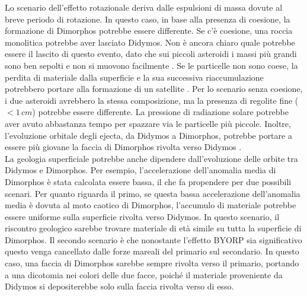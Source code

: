 \documentclass[a4paper,11pt,openright]{book}
\begin{document}
Lo scenario dell'effetto rotazionale deriva dalle espulsioni di massa dovute al breve periodo di rotazione. In questo caso, in base alla presenza di coesione, la formazione di Dimorphos potrebbe essere differente. Se c'è coesione, una roccia monolitica potrebbe aver lasciato Didymos. Non è ancora chiaro quale potrebbe essere il lascito di questo evento, dato che sui piccoli asteroidi i massi più grandi sono ben sepolti e non si muovono facilmente \citep{daly_hemispherical_2020}. Se le particelle non sono coese, la perdita di materiale dalla superficie e la sua successiva riaccumulazione potrebbero portare alla formazione di un satellite \citep{walsh_spin-up_2012}. Per lo scenario senza coesione, i due asteroidi avrebbero la stessa composizione, ma la presenza di regolite fine ($<1\,cm$) potrebbe essere differente. La pressione di radiazione solare potrebbe aver avuto abbastanza tempo per spazzare via le particelle più piccole. Inoltre, l'evoluzione orbitale degli ejecta, da Didymos a Dimorphos, potrebbe portare a essere più giovane la faccia di Dimorphos rivolta verso Didymos \citep{agrusa_excited_2021}.\\
La geologia superficiale potrebbe anche dipendere dall'evoluzione delle orbite tra Didymos e Dimorphos. Per esempio, l'accelerazione dell'anomalia media di Dimorphos è stata calcolata essere bassa, il che fa propendere per due possibili scenari. Per quanto riguarda il primo, se questa bassa accelerazione dell'anomalia media è dovuta al moto caotico di Dimorphos, l'accumulo di materiale potrebbe essere uniforme sulla superficie rivolta verso Didymos. In questo scenario, il riscontro geologico sarebbe trovare materiale di età simile su tutta la superficie di Dimorphos. Il secondo scenario è che nonostante l'effetto BYORP sia significativo questo venga cancellato dalle forze mareali del primario sul secondario. In questo caso, una faccia di Dimorphos sarebbe sempre rivolta verso il primario, portando a una dicotomia nei colori delle due facce, poiché il materiale proveniente da Didymos si depositerebbe solo sulla faccia rivolta verso di esso.
\end{document}
